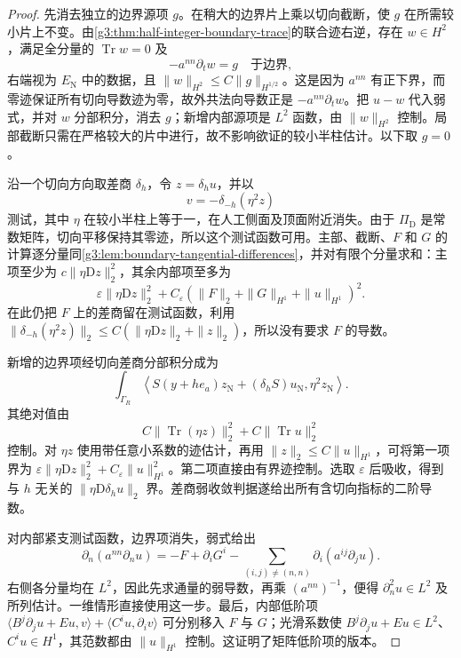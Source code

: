 \begin{proof}
	先消去独立的边界源项 \(g\)。在稍大的边界片上乘以切向截断，使 \(g\) 在所需较小片上不变。由\cref{g3:thm:half-integer-boundary-trace}的联合迹右逆，存在 \(w\in H^2\)，满足全分量的 \(\operatorname{Tr}w=0\) 及
	\[
		-a^{nn}\partial_t w=g\quad\text{于边界},
	\]
	右端视为 \(E_{\mathrm N}\) 中的数据，且 \(\|w\|_{H^2}\le C\|g\|_{H^{1/2}}\)。这是因为 \(a^{nn}\) 有正下界，而零迹保证所有切向导数迹为零，故外共法向导数正是 \(-a^{nn}\partial_t w\)。把 \(u-w\) 代入弱式，并对 \(w\) 分部积分，消去 \(g\)；新增内部源项是 \(L^2\) 函数，由 \(\|w\|_{H^2}\) 控制。局部截断只需在严格较大的片中进行，故不影响欲证的较小半柱估计。以下取 \(g=0\)。

	沿一个切向方向取差商 \(\delta_h\)，令 \(z=\delta_hu\)，并以
	\[
		v=-\delta_{-h}(\eta^2z)
	\]
	测试，其中 \(\eta\) 在较小半柱上等于一，在人工侧面及顶面附近消失。由于 \(\Pi_{\mathrm D}\) 是常数矩阵，切向平移保持其零迹，所以这个测试函数可用。主部、截断、\(F\) 和 \(G\) 的计算逐分量同\cref{g3:lem:boundary-tangential-differences}，并对有限个分量求和：主项至少为 \(c\|\eta\mathrm Dz\|_2^2\)，其余内部项至多为
	\[
		\varepsilon\|\eta\mathrm Dz\|_2^2
		+C_\varepsilon(\|F\|_2+\|G\|_{H^1}+\|u\|_{H^1})^2.
	\]
	在此仍把 \(F\) 上的差商留在测试函数，利用
	\(\|\delta_{-h}(\eta^2z)\|_2\le C(\|\eta\mathrm Dz\|_2+\|z\|_2)\)，所以没有要求 \(F\) 的导数。

	新增的边界项经切向差商分部积分成为
	\[
		\int_{\Gamma_R}
		\left\langle
		S(y+he_a)z_{\mathrm N}+(\delta_hS)u_{\mathrm N},
		\eta^2z_{\mathrm N}\right\rangle.
	\]
	其绝对值由
	\[
		C\|\operatorname{Tr}(\eta z)\|_2^2
		+C\|\operatorname{Tr}u\|_2^2
	\]
	控制。对 \(\eta z\) 使用带任意小系数的迹估计，再用
	\(\|z\|_2\le C\|u\|_{H^1}\)，可将第一项界为
	\(\varepsilon\|\eta\mathrm Dz\|_2^2+C_\varepsilon\|u\|_{H^1}^2\)。第二项直接由有界迹控制。选取 \(\varepsilon\) 后吸收，得到与 \(h\) 无关的 \(\|\eta\mathrm D\delta_hu\|_2\) 界。差商弱收敛判据遂给出所有含切向指标的二阶导数。

	对内部紧支测试函数，边界项消失，弱式给出
	\[
		\partial_n(a^{nn}\partial_nu)
		=-F+\partial_iG^i
		-\sum_{(i,j)\ne(n,n)}\partial_i(a^{ij}\partial_ju).
	\]
	右侧各分量均在 \(L^2\)，因此先求通量的弱导数，再乘 \((a^{nn})^{-1}\)，便得 \(\partial_n^2u\in L^2\) 及所列估计。一维情形直接使用这一步。最后，内部低阶项
	\(\langle B^j\partial_ju+Eu,v\rangle+\langle C^iu,\partial_iv\rangle\)
	可分别移入 \(F\) 与 \(G\)；光滑系数使 \(B^j\partial_ju+Eu\in L^2\)、\(C^iu\in H^1\)，其范数都由 \(\|u\|_{H^1}\) 控制。这证明了矩阵低阶项的版本。
\end{proof}

